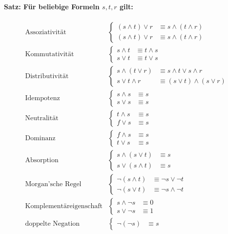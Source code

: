 \paragraph{Satz: Für beliebige Formeln $s,t,r$ gilt:}
\begin{align*}
\text{Assoziativität}&\begin{cases}
(s \land t) \lor r &\equiv s \land (t \land r)\\
(s \land t) \lor r &\equiv s \land (t \land r)
\end{cases} \\
%
\text{Kommutativität}&\begin{cases}
s \land t &\equiv t \land s\\
s \lor t &\equiv t \lor s
\end{cases} \\
%
\text{Distributivität}&\begin{cases}
s \land (t \lor r) &\equiv s \land t \lor s \land r\\
s \lor t \land r &\equiv (s \lor t) \land (s \lor r)
\end{cases} \\
%
\text{Idempotenz}&\begin{cases}
s \land s &\equiv s \\
s \lor s &\equiv s
\end{cases} \\
%
\text{Neutralität}&\begin{cases}
t \land s &\equiv s \\
f \lor s &\equiv s
\end{cases} \\
%
\text{Dominanz}&\begin{cases}
f \land s &\equiv s \\
t \lor s &\equiv s
\end{cases} \\
%
\text{Absorption}&\begin{cases}
s \land (s \lor t) &\equiv s \\
s \lor (s \land t) &\equiv s
\end{cases} \\
%
\text{Morgan'sche Regel}&\begin{cases}
\neg (s \land t) &\equiv \neg s \lor \neg t\\
\neg (s \lor t) &\equiv \neg s \land \neg t
\end{cases} \\
%
\text{Komplementäreigenschaft}&\begin{cases}
s \land \neg s &\equiv 0 \\
s \lor \neg s &\equiv 1
\end{cases} \\
%
\text{doppelte Negation}&\begin{cases}
\neg (\neg s) &\equiv s
\end{cases} \\
\end{align*}
%
